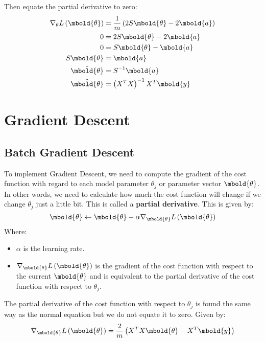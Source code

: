 \documentclass[12pt letter]{report}
\begin{document}
Then equate the partial derivative to zero:
\begin{align*}
  \nabla_{\theta} L \left( \mbold{\theta} \right) & = \frac{1}{m} \left( 2S \mbold{\theta} - 2 \mbold{a}  \right) \\
  0                                               & = 2S \mbold{\theta} - 2\mbold{a}                              \\
  0                                               & = S \mbold{\theta} - \mbold{a}                                \\
  S \mbold{\theta}                                & = \mbold{a}                                                   \\
  \hat{\mbold{\theta}}                            & = S^{-1}\mbold{a}                                             \\
  \hat{\mbold{\theta}}                            & = \left( X^{T} X \right)^{-1} X^{T} \mbold{y}                 \\
\end{align*}


\section{Gradient Descent}

\subsection{Batch Gradient Descent}

To implement Gradient Descent, we need to compute the gradient of the cost function with regard to each model parameter
$\theta_j$ or parameter vector $\mbold{\theta}$. In other words, we need to calculate how much the cost function will
change if we change $\theta_j$ just a little bit. This is called a \textbf{partial derivative}. This is given by:
\[
  \mbold{\theta} \leftarrow \mbold{\theta} - \alpha \nabla_{\mbold{\theta}} L \left( \mbold{\theta} \right)
\]
Where:
\begin{itemize}
  \item $\alpha$ is the learning rate.
  \item $\nabla_{\mbold{\theta}} L \left( \mbold{\theta} \right) $ is the gradient of the cost function with respect to the current
        $\mbold{\theta}$ and is equivalent to the partial derivative of the cost function with respect to $\theta_j$.
\end{itemize}
The partial derivative of the cost function with respect to $\theta_j$ is found the same way as the normal equation but
we do not equate it to zero. Given by:
\[
  \nabla_{\mbold{\theta}} L \left( \mbold{\theta} \right)  = \frac{2}{m} \left( X^{T} X \mbold{\theta} - X^{T} \mbold{y} \right)
\]
\end{document}
